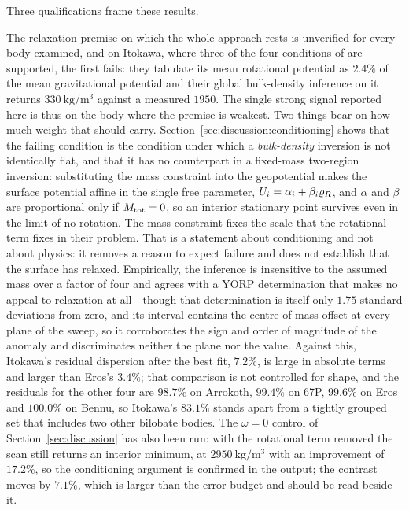Three qualifications frame these results.

The relaxation premise on which the whole approach rests is unverified for
every body examined, and on Itokawa, where three of the four conditions of
\citet{richardson2014} are supported, the first fails: they tabulate its
mean rotational potential as $2.4\%$ of the mean gravitational potential
and their global bulk-density inference on it returns
$\SI{330}{\kilo\gram\per\cubic\metre}$ against a measured $1950$. The
single strong signal reported here is thus on the body where the premise
is weakest. Two things bear on how much weight that should carry.
Section~\ref{sec:discussion:conditioning} shows that the failing condition
is the condition under which a \emph{bulk-density} inversion is not
identically flat, and that it has no counterpart in a fixed-mass
two-region inversion: substituting the mass constraint into the
geopotential makes the surface potential affine in the single free
parameter, $U_i = \alpha_i + \beta_i\varrho_{R}$, and $\alpha$ and $\beta$
are proportional only if $M_{\mathrm{tot}} = 0$, so an interior stationary point
survives even in the limit of no rotation. The mass constraint fixes the
scale that the rotational term fixes in their problem. That is a statement
about conditioning and not about physics: it removes a reason to expect
failure and does not establish that the surface has relaxed. Empirically,
the inference is insensitive to the assumed mass over a factor of four and
agrees with a YORP determination that makes no appeal to relaxation at
all---though that determination is itself only $1.75$ standard deviations
from zero, and its interval contains the centre-of-mass offset at every
plane of the sweep, so it corroborates the sign and order of magnitude of
the anomaly and discriminates neither the plane nor the value. Against
this, Itokawa's residual dispersion after the best fit, $7.2\%$, is large
in absolute terms and larger than Eros's $3.4\%$; that comparison is not
controlled for shape, and the residuals for the other four are $98.7\%$ on Arrokoth,
$99.4\%$ on 67P, $99.6\%$ on Eros and $100.0\%$ on Bennu, so Itokawa's
$83.1\%$ stands apart from a tightly grouped set that includes two other
bilobate bodies. The $\omega = 0$ control of Section~\ref{sec:discussion}
has also been run: with the rotational term removed the scan still returns
an interior minimum, at $\SI{2950}{\kilo\gram\per\cubic\metre}$ with an
improvement of $17.2\%$, so the conditioning argument is confirmed in the
output; the contrast moves by $7.1\%$, which is larger than the error
budget and should be read beside it.

